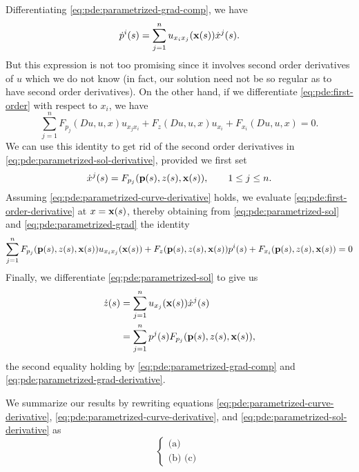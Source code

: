 Differentiating \eqref{eq:pde:parametrized-grad-comp}, we have
\begin{equation}
  \label{eq:pde:parametrized-grad-derivative}
  \dot p^i(s)=\sum_{j=1}^n u_{x_ix_j}(\mathbf{x}(s))\dot x^j(s).
\end{equation}
But this expression is not too promising since it involves second order
derivatives of \(u\) which we do not know (in fact, our solution need not
be so regular as to have second order derivatives). On the other hand, if
we differentiate \eqref{eq:pde:first-order} with respect to \(x_i\), we
have
\begin{equation}
  \label{eq:pde:first-order-derivative}
  \sum_{j=1}^n F_{p_j}(Du,u,x)u_{x_jx_i}+F_z(Du,u,x)u_{x_i}+F_{x_i}(Du,u,x)=0.
\end{equation}
We can use this identity to get rid of the second order derivatives in
\eqref{eq:pde:parametrized-sol-derivative}, provided we first set
\begin{equation}
  \label{eq:pde:parametrized-curve-derivative}
  \dot x^j(s)=F_{p_j}(\mathbf{p}(s),z(s),\mathbf{x}(s)),\qquad 1\leq j\leq n.
\end{equation}
Assuming \eqref{eq:pde:parametrized-curve-derivative} holds, we evaluate
\eqref{eq:pde:first-order-derivative} at \(x=\mathbf{x}(s)\), thereby obtaining
from \eqref{eq:pde:parametrized-sol} and \eqref{eq:pde:parametrized-grad}
the identity
\[
  \sum_{j=1}^n F_{p_j}(\mathbf{p}(s),z(s),\mathbf{x}(s))u_{x_ix_j}(\mathbf{x}(s))+
  F_z(\mathbf{p}(s),z(s),\mathbf{x}(s))p^i(s)+F_{x_i}(\mathbf{p}(s),z(s),\mathbf{x}(s))=0
\]
Finally, we differentiate \eqref{eq:pde:parametrized-sol} to give us
\begin{equation}
  \label{eq:pde:parametrized-sol-derivative}
  \begin{aligned}
    \dot z(s)
    &=\sum_{j=1}^n u_{x_j}(\mathbf{x}(s))\dot x^j(s)\\
    &=\sum_{j=1}^n p^j(s)F_{p_j}(\mathbf{p}(s),z(s),\mathbf{x}(s)),
  \end{aligned}
\end{equation}
the second equality holding by \eqref{eq:pde:parametrized-grad-comp} and
\eqref{eq:pde:parametrized-grad-derivative}.

We summarize our results by rewriting equations
\eqref{eq:pde:parametrized-curve-derivative},
\eqref{eq:pde:parametrized-curve-derivative}, and
\eqref{eq:pde:parametrized-sol-derivative} as
\begin{equation}
  \label{eq:pde:first-order-characteristics}
  \left\{
    \begin{aligned}
      \text{(a) }\\
      \text{(b) }
      \text{(c) }
    \end{aligned}
  \right.
\end{equation}

